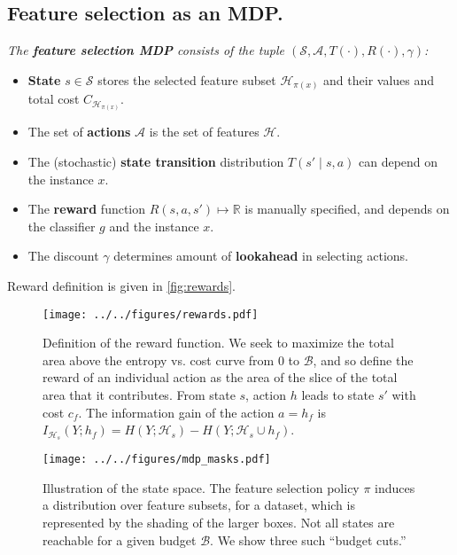 \subsection{Feature selection as an MDP.}
{\itshape
The \textbf{feature selection MDP} consists of the tuple $(\mathcal{S}, \mathcal{A}, T(\cdot), R(\cdot), \gamma)$:
\begin{itemize}\addtolength{\itemsep}{-.55\baselineskip}
\item \textbf{State} $s \in \mathcal{S}$ stores the selected feature subset $\mathcal{H}_{\pi(x)}$ and their values and total cost $C_{\mathcal{H}_{\pi(x)}}$.
\item The set of \textbf{actions} $\mathcal{A}$ is the set of features $\mathcal{H}$.
\item The (stochastic) \textbf{state transition} distribution $T(s' \mid s, a)$ can depend on the instance $x$.
\item The \textbf{reward} function $R(s, a, s') \mapsto \mathbb{R}$ is manually specified, and depends on the classifier $g$ and the instance $x$.
\item The discount $\gamma$ determines amount of \textbf{lookahead} in selecting actions.
\end{itemize}
}

Reward definition is given in \autoref{fig:rewards}.

\vspace{1em}
\begin{figure}[h!]
    \centering
    \texttt{[image: ../../figures/rewards.pdf]}
    \caption{
    Definition of the reward function.
    We seek to maximize the total area above the entropy vs. cost curve from $0$ to $\mathcal{B}$, and so define the reward of an individual action as the area of the slice of the total area that it contributes.
    From state $s$, action $h$ leads to state $s'$ with cost $c_f$.
    The information gain of the action $a = h_f$ is $I_{\mathcal{H}_s}(Y; h_f) = H(Y; \mathcal{H}_s) - H(Y; \mathcal{H}_s \cup {h_f})$.
    \label{fig:rewards}
    }


    \texttt{[image: ../../figures/mdp\_masks.pdf]}
    \caption{
    Illustration of the state space.
    The feature selection policy $\pi$ induces a distribution over feature subsets, for a dataset, which is represented by the shading of the larger boxes.
    Not all states are reachable for a given budget $\mathcal{B}$.
    We show three such ``budget cuts.''
    \label{fig:state_space}
    }
\end{figure}

